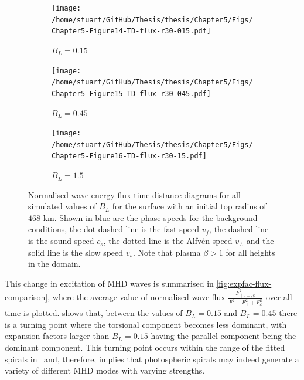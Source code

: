 \documentclass[a4paper,12pt,fourier,authoryear,custommargin]{Classes/PhDThesisPSnPDF}
\begin{document}
\begin{figure}
    \centering
\ContinuedFloat
    

    \begin{subfigure}[b]{0.9\columnwidth}
        \texttt{[image: /home/stuart/GitHub/Thesis/thesis/Chapter5/Figs/Chapter5-Figure14-TD-flux-r30-015.pdf]}
        \caption{$B_L = 0.15$}
        \label{fig:TD-flux-r30-015}
    \end{subfigure}

    \begin{subfigure}[b]{0.9\columnwidth}
        \texttt{[image: /home/stuart/GitHub/Thesis/thesis/Chapter5/Figs/Chapter5-Figure15-TD-flux-r30-045.pdf]}
        \caption{$B_L = 0.45$}
        \label{fig:TD-flux-r30-045}
    \end{subfigure}
    \caption{}
    \label{fig:}
\end{figure}

\begin{figure}
    \centering
\ContinuedFloat
    

    \begin{subfigure}[b]{0.9\columnwidth}
        \texttt{[image: /home/stuart/GitHub/Thesis/thesis/Chapter5/Figs/Chapter5-Figure16-TD-flux-r30-15.pdf]}
        \caption{$B_L = 1.5$}
        \label{fig:TD-flux-r30-15}
    \end{subfigure}
    \caption{Normalised wave energy flux time-distance diagrams for all simulated values of $B_L$ for the surface with an initial top radius of $468$ km. Shown in blue are the phase speeds for the background conditions, the dot-dashed line is the fast speed $v_f$, the dashed line is the sound speed $c_s$, the dotted line is the Alfv\'en speed $v_A$ and the solid line is the slow speed $v_s$. Note that plasma $\beta > 1$ for all heights in the domain.}
    \label{fig:TD-flux-r30}
\end{figure}


This change in excitation of MHD waves is summarised in \cref{fig:expfac-flux-comparison}, where the average value of normalised wave flux $\displaystyle\frac{F_{\parallel, \perp, \phi}^2}{F_\parallel^2 + F_\perp^2 + F_\phi^2}$ over all time is plotted.
 shows that, between the values of $B_L=0.15$ and $B_L=0.45$ there is a turning point where the torsional component becomes less dominant, with expansion factors larger than $B_L=0.15$ having the parallel component being the dominant component.
This turning point occurs within the range of the fitted spirals in~\cite{bonet2008} and, therefore, implies that photospheric spirals may indeed generate a variety of different MHD modes with varying strengths.
\end{document}
